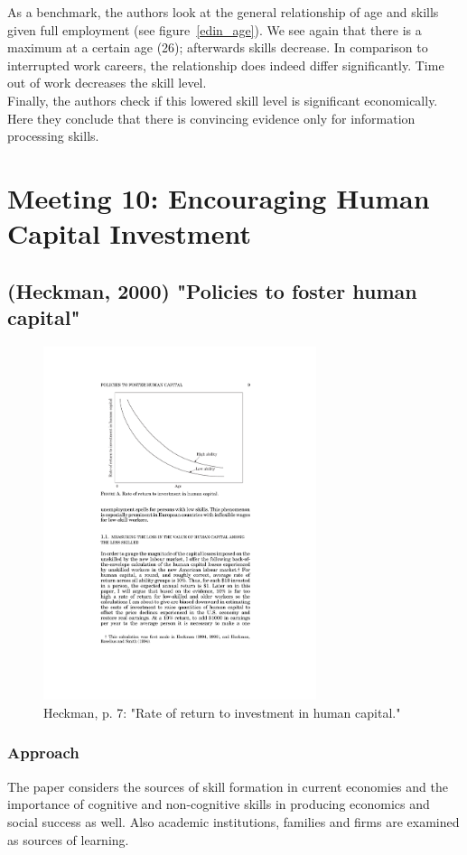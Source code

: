 \documentclass[12pt,a4paper]{article}
\begin{document}
  As a benchmark, the authors look at the general relationship of age and skills given full employment (see figure~\ref{edin_age}).
  We see again that there is a maximum at a certain age (26); afterwards skills decrease. In comparison to interrupted work
  careers, the relationship does indeed differ significantly. Time out of work decreases the skill level.\\
  Finally, the authors check if this lowered skill level is significant economically. Here they conclude that there is convincing
  evidence only for information processing skills. 


  \section{Meeting 10: Encouraging Human Capital Investment} %
    \label{sec:Meeting 10}
    \subsection{(Heckman, 2000) "Policies to foster human capital"}
    \label{sec:Heckman2000}

    \begin{figure}[htb]
      \centering
      \includegraphics[width=8cm]{Meeting 10 Policies to foster human capital - Seite 7.pdf}
      \caption{Heckman, p. 7: "Rate of return to investment in human capital."}
      \label{fig:Heckman rateofreturnhumancapital}
    \end{figure}

    \subsubsection{Approach}
        The paper considers the sources of skill formation in current economies and the importance of cognitive and non-cognitive skills in producing economics and social success as well. Also academic institutions, families and firms are examined as sources of learning.
\end{document}
